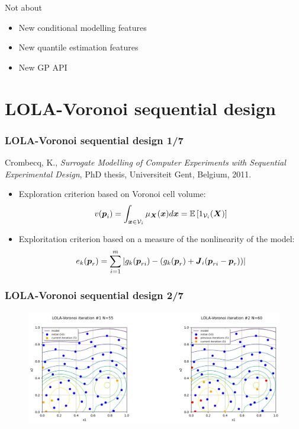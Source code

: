 \documentclass[aspectratio=169]{beamer}
\begin{document}
\begin{frame}{Not about}

\begin{itemize}
\item New conditional modelling features
\item New quantile estimation features
\item New GP API
\end{itemize}

\end{frame}


\section{LOLA-Voronoi sequential design}

\begin{frame}
\frametitle{LOLA-Voronoi sequential design 1/7}

Crombecq, K., \textit{Surrogate Modelling of Computer Experiments with Sequential Experimental Design}, PhD thesis, Universiteit Gent, Belgium, 2011.

\begin{itemize}
\item Exploration criterion based on Voronoi cell volume:
  $$v({\mathbf{\boldsymbol{{p}}}}_i) = \int_{{\mathbf{\boldsymbol{{x}}}} \in \mathcal{V}_i} \mu_{{\mathbf{\boldsymbol{{X}}}}}({\mathbf{\boldsymbol{{x}}}}) d{\mathbf{\boldsymbol{{x}}}} = {\mathbb E}\left[ 1_{\mathcal{V}_i}({\mathbf{\boldsymbol{{X}}}}) \right]$$
\item Exploritation criterion based on a measure of the nonlinearity of the model:
  $$e_k({\mathbf{\boldsymbol{{p}}}}_r) = \sum_{i=1}^m | g_k({\mathbf{\boldsymbol{{p}}}}_{ri}) - (g_k({\mathbf{\boldsymbol{{p}}}}_r) + {{\mathbf{\boldsymbol{{{\mathbf{\boldsymbol{{J}}}}}}}}}_i({\mathbf{\boldsymbol{{p}}}}_{ri} - {\mathbf{\boldsymbol{{p}}}}_r)) |$$
\end{itemize}

\end{frame}


\begin{frame}
\frametitle{LOLA-Voronoi sequential design 2/7}

\begin{figure}
   \includegraphics[width=1.04\textwidth]{figures/lolavoronoi_1}
\end{figure}

\end{frame}
\end{document}
